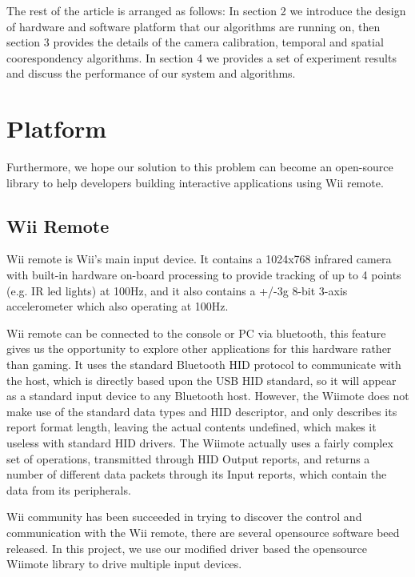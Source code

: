 \documentclass[10pt,twocolumn,letterpaper]{article}
\begin{document}
The rest of the article is arranged as follows: In section 2 we introduce the design
of hardware and software platform that our algorithms are running on, then section 3
provides the details of the camera calibration, 
temporal and spatial coorespondency algorithms. In section 4 we provides a set of
experiment results and discuss the performance of our system and algorithms.



\section{Platform}
Furthermore, we hope our solution to this problem can become 
an open-source library to help developers building interactive 
applications using Wii remote.
\subsection{Wii Remote}
Wii remote is Wii's main input device. It contains a 1024x768 infrared camera with 
built-in hardware on-board processing to provide 
tracking of up to 4 points (e.g. IR led lights) at 100Hz, 
and it also contains a +/-3g 8-bit 3-axis accelerometer 
which also operating at 100Hz.

Wii remote can be connected to the console 
or PC via bluetooth, this feature gives us the opportunity 
to explore other applications for this hardware rather 
than gaming. 
It uses the standard Bluetooth HID protocol to 
communicate with the host, which is directly based upon 
the USB HID standard, so it will appear as a 
standard input device to any Bluetooth host. 
However, the Wiimote does not make use of the standard 
data types and HID descriptor, and only describes 
its report format length, leaving the actual contents undefined, 
which makes it useless with standard HID drivers. 
The Wiimote actually uses a fairly complex set of operations, 
transmitted through HID Output reports, and returns a number 
of different data packets through its Input reports, 
which contain the data from its peripherals.

Wii community has been succeeded in trying 
to discover the control and communication with the Wii remote, 
there are several opensource software beed released.
In this project, we use our modified driver based the 
opensource Wiimote library to drive multiple input devices.
\end{document}
